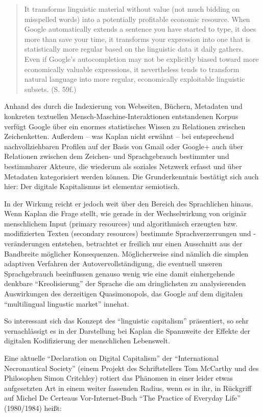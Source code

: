 \documentclass[a4paper,
fontsize=11pt,
oneside,
numbers=noperiodatend,
parskip=half-,
bibliography=totoc,
final
]{scrartcl}
\begin{document}
\begin{quote}
It transforms linguistic material without value (not much bidding on
misspelled words) into a potentially profitable economic resource. When
Google automatically extends a sentence you have started to type, it
does more than save your time, it transforms your expression into one
that is statistically more regular based on the linguistic data it daily
gathers. Even if Google's autocompletion may not be explicitly biased
toward more economically valuable expressions, it nevertheless tends to
transform natural language into more regular, economically exploitable
linguistic subsets. (S. 59f.)
\end{quote}

Anhand des durch die Indexierung von Webseiten, Büchern, Metadaten und
konkreten textuellen Mensch-Maschine-Interaktionen entstandenen Korpus
verfügt Google über ein enormes statistisches Wissen zu Relationen
zwischen Zeichenketten. Außerdem -- was Kaplan nicht erwähnt -- bei
entsprechend nachvollziehbaren Profilen auf der Basis von Gmail oder
Google+ auch über Relationen zwischen dem Zeichen- und Sprachgebrauch
bestimmter und bestimmbarer Akteure, die wiederum als soziales Netzwerk
erfasst und über Metadaten kategorisiert werden können. Die
Grunderkenntnis bestätigt sich auch hier: Der digitale Kapitalismus ist
elementar semiotisch.

In der Wirkung reicht er jedoch weit über den Bereich des Sprachlichen
hinaus. Wenn Kaplan die Frage stellt, wie gerade in der Wechselwirkung
von originär menschlichem Input (primary resources) und algorithmisch
erzeugten bzw. modifizierten Texten (secondary resources) bestimmte
Sprachverzerrungen und -veränderungen entstehen, betrachtet er freilich
nur einen Ausschnitt aus der Bandbreite möglicher Konsequenzen.
Möglicherweise sind nämlich die simplen adaptiven Verfahren der
Autovervollständigung, die eventuell unseren Sprachgebrauch beeinflussen
genauso wenig wie eine damit einhergehende denkbare
\enquote{Kreolisierung} der Sprache die am dringlichsten zu
analysierenden Auswirkungen des derzeitigen Quasimonopols, das Google
auf dem digitalen \enquote{multilingual lingustic market} innehat.

So interessant sich das Konzept des \enquote{linguistic capitalism}
präsentiert, so sehr vernachlässigt es in der Darstellung bei Kaplan die
Spannweite der Effekte der digitalen Kodifizierung der menschlichen
Lebenswelt.

Eine aktuelle \enquote{Declaration on Digital Capitalism} der
\enquote{International Necronautical Society} (einem Projekt des
Schriftstellers Tom McCarthy und des Philosophen Simon Critchley)
rotiert das Phänomen in einer leider etwas aufgesetzten Art in einem
weiter fassenden Radius, wenn es in ihr, in Rückgriff auf Michel De
Certeaus Vor-Internet-Buch \enquote{The Practice of Everyday Life}
(1980/1984) heißt:
\end{document}

